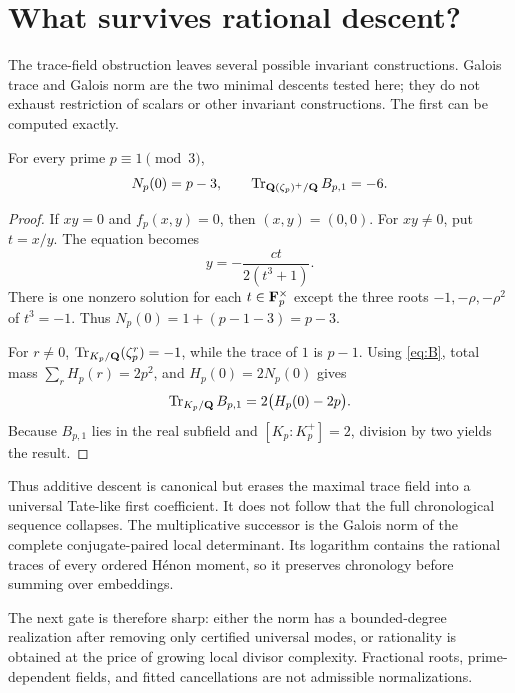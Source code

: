 \section{What survives rational descent?}

The trace-field obstruction leaves several possible invariant constructions.
Galois trace and Galois norm are the two minimal descents tested here; they do
not exhaust restriction of scalars or other invariant constructions.  The
first can be computed exactly.

\begin{proposition}\label{prop:trace}
For every prime $p\equiv1\pmod3$,
\[
 N_p(0)=p-3,
 \qquad
 \operatorname{Tr}_{\mathbf Q(\zeta_p)^+/\mathbf Q}B_{p,1}=-6.
\]
\end{proposition}

\begin{proof}
If $xy=0$ and $f_p(x,y)=0$, then $(x,y)=(0,0)$.  For $xy\ne0$, put
$t=x/y$.  The equation becomes
\[
 y=-\frac{ct}{2(t^3+1)}.
\]
There is one nonzero solution for each $t\in\mathbf F_p^\times$ except the three
roots $-1,-\rho,-\rho^2$ of $t^3=-1$.  Thus
$N_p(0)=1+(p-1-3)=p-3$.

For $r\ne0$, $\operatorname{Tr}_{K_p/\mathbf Q}(\zeta_p^r)=-1$, while the trace of $1$ is
$p-1$.  Using \eqref{eq:B}, total mass $\sum_rH_p(r)=2p^2$, and
$H_p(0)=2N_p(0)$ gives
\[
 \operatorname{Tr}_{K_p/\mathbf Q}B_{p,1}=2\bigl(H_p(0)-2p\bigr).
\]
Because $B_{p,1}$ lies in the real subfield and $[K_p:K_p^+]=2$, division by
two yields the result.
\end{proof}

Thus additive descent is canonical but erases the maximal trace field into a
universal Tate-like first coefficient.  It does not follow that the full
chronological sequence collapses.  The multiplicative successor is the
Galois norm of the complete conjugate-paired local determinant.  Its logarithm
contains the rational traces of every ordered H\'enon moment, so it preserves
chronology before summing over embeddings.

The next gate is therefore sharp: either the norm has a bounded-degree
realization after removing only certified universal modes, or rationality is
obtained at the price of growing local divisor complexity.  Fractional roots,
prime-dependent fields, and fitted cancellations are not admissible
normalizations.
